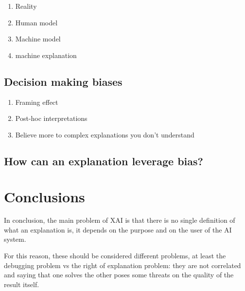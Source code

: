 \documentclass[conference]{IEEEtran}
\begin{document}
\begin{enumerate}
    \item Reality
    \item Human model
    \item Machine model
    \item machine explanation
\end{enumerate}

\subsection{Decision making biases}
\label{sec:tradeoff}

\begin{enumerate}
    \item Framing effect
    \item Post-hoc interpretations
    \item Believe more to complex explanations you don't understand
\end{enumerate}

\subsection{How can an explanation leverage bias?}
\label{sec:bias}


\section{Conclusions}
\label{sec:conclusions}


In conclusion, the main problem of XAI is that there is no single definition of
what an explanation is, it depends on the purpose and on the user of the AI
system.

For this reason, these should be considered different problems, at least the
debugging problem vs the right of explanation problem: they are not correlated
and saying that one solves the other poses some threats on the quality of the
result itself.



\end{document}
